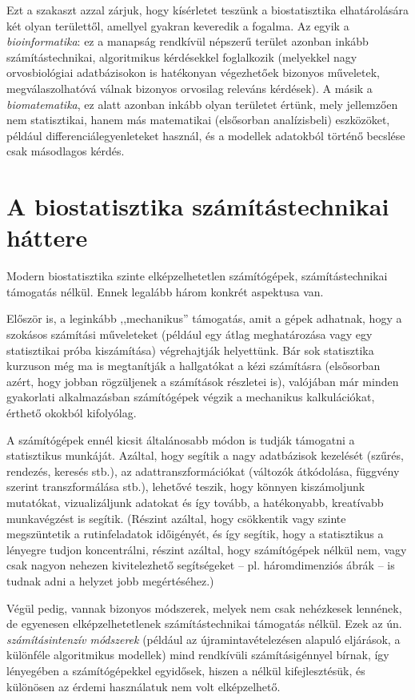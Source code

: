 \documentclass[
]{book}
\begin{document}
Ezt a szakaszt azzal zárjuk, hogy kísérletet teszünk a biostatisztika elhatárolására két olyan területtől, amellyel gyakran keveredik a fogalma. Az egyik a \emph{bioinformatika}: ez a manapság rendkívül népszerű terület azonban inkább számítástechnikai, algoritmikus kérdésekkel foglalkozik (melyekkel nagy orvosbiológiai adatbázisokon is hatékonyan végezhetőek bizonyos műveletek, megválaszolhatóvá válnak bizonyos orvosilag releváns kérdések). A másik a \emph{biomatematika}, ez alatt azonban inkább olyan területet értünk, mely jellemzően nem statisztikai, hanem más matematikai (elsősorban analízisbeli) eszközöket, például differenciálegyenleteket használ, és a modellek adatokból történő becslése csak másodlagos kérdés.

\hypertarget{alapokszamtech}{%
\section{A biostatisztika számítástechnikai háttere}\label{alapokszamtech}}

Modern biostatisztika szinte elképzelhetetlen számítógépek, számítástechnikai támogatás nélkül. Ennek legalább három konkrét aspektusa van.

Először is, a leginkább ,,mechanikus'' támogatás, amit a gépek adhatnak, hogy a szokásos számítási műveleteket (például egy átlag meghatározása vagy egy statisztikai próba kiszámítása) végrehajtják helyettünk. Bár sok statisztika kurzuson még ma is megtanítják a hallgatókat a kézi számításra (elsősorban azért, hogy jobban rögzüljenek a számítások részletei is), valójában már minden gyakorlati alkalmazásban számítógépek végzik a mechanikus kalkulációkat, érthető okokból kifolyólag.

A számítógépek ennél kicsit általánosabb módon is tudják támogatni a statisztikus munkáját. Azáltal, hogy segítik a nagy adatbázisok kezelését (szűrés, rendezés, keresés stb.), az adattranszformációkat (változók átkódolása, függvény szerint transzformálása stb.), lehetővé teszik, hogy könnyen kiszámoljunk mutatókat, vizualizáljunk adatokat és így tovább, a hatékonyabb, kreatívabb munkavégzést is segítik. (Részint azáltal, hogy csökkentik vagy szinte megszüntetik a rutinfeladatok időigényét, és így segítik, hogy a statisztikus a lényegre tudjon koncentrálni, részint azáltal, hogy számítógépek nélkül nem, vagy csak nagyon nehezen kivitelezhető segítségeket -- pl. háromdimenziós ábrák -- is tudnak adni a helyzet jobb megértéséhez.)

Végül pedig, vannak bizonyos módszerek, melyek nem csak nehézkesek lennének, de egyenesen elképzelhetetlenek számítástechnikai támogatás nélkül. Ezek az ún. \emph{számításintenzív módszerek} (például az újramintavételezésen alapuló eljárások, a különféle algoritmikus modellek) mind rendkívüli számításigénnyel bírnak, így lényegében a számítógépekkel egyidősek, hiszen a nélkül kifejlesztésük, és különösen az érdemi használatuk nem volt elképzelhető.
\end{document}
